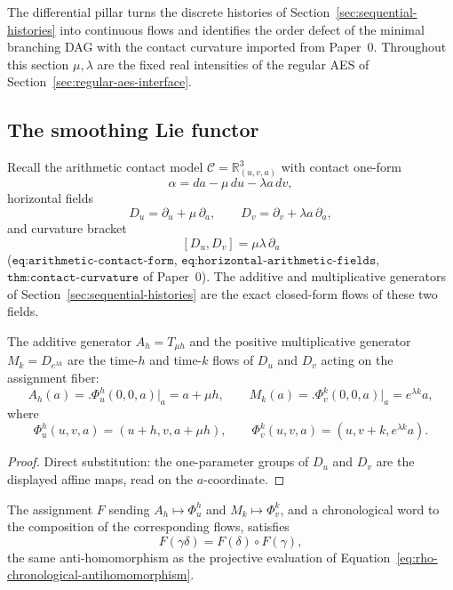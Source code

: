 
The differential pillar turns the discrete histories of
Section~\ref{sec:sequential-histories} into continuous flows and identifies the
order defect of the minimal branching DAG with the contact curvature imported
from Paper~0.  Throughout this section $\mu,\lambda$ are the fixed real
intensities of the regular AES of Section~\ref{sec:regular-aes-interface}.

\subsection{The smoothing Lie functor}

Recall the arithmetic contact model $\mathcal C=\mathbb R^3_{(u,v,a)}$ with
contact one-form
\[
  \alpha=da-\mu\,du-\lambda a\,dv,
\]
horizontal fields
\[
  D_u=\partial_u+\mu\,\partial_a,
  \qquad
  D_v=\partial_v+\lambda a\,\partial_a,
\]
and curvature bracket
\[
  [D_u,D_v]=\mu\lambda\,\partial_a
\]
($\texttt{eq:arithmetic-contact-form}$,
$\texttt{eq:horizontal-arithmetic-fields}$,
$\texttt{thm:contact-curvature}$ of Paper~0).  The additive and multiplicative
generators of Section~\ref{sec:sequential-histories} are the exact closed-form
flows of these two fields.

\begin{lemma}
\label{lem:generators-exact-flows}
The additive generator $A_h=T_{\mu h}$ and the positive multiplicative generator
$M_k=D_{e^{\lambda k}}$ are the time-$h$ and time-$k$ flows of $D_u$ and $D_v$
acting on the assignment fiber:
\[
  A_h(a)=\bigl.\Phi_u^h(0,0,a)\bigr|_a=a+\mu h,
  \qquad
  M_k(a)=\bigl.\Phi_v^k(0,0,a)\bigr|_a=e^{\lambda k}a,
\]
where
\[
  \Phi_u^h(u,v,a)=(u+h,v,a+\mu h),
  \qquad
  \Phi_v^k(u,v,a)=(u,v+k,e^{\lambda k}a).
\]
\end{lemma}

\begin{proof}
Direct substitution: the one-parameter groups of $D_u$ and $D_v$ are the
displayed affine maps, read on the $a$-coordinate.
\end{proof}

\begin{lemma}
\label{lem:word-flow-antihomomorphism}
The assignment $F$ sending $A_h\mapsto\Phi_u^h$ and $M_k\mapsto\Phi_v^k$, and a
chronological word to the composition of the corresponding flows, satisfies
\[
  F(\gamma\delta)=F(\delta)\circ F(\gamma),
\]
the same anti-homomorphism as the projective evaluation of
Equation~\eqref{eq:rho-chronological-antihomomorphism}.
\end{lemma}

